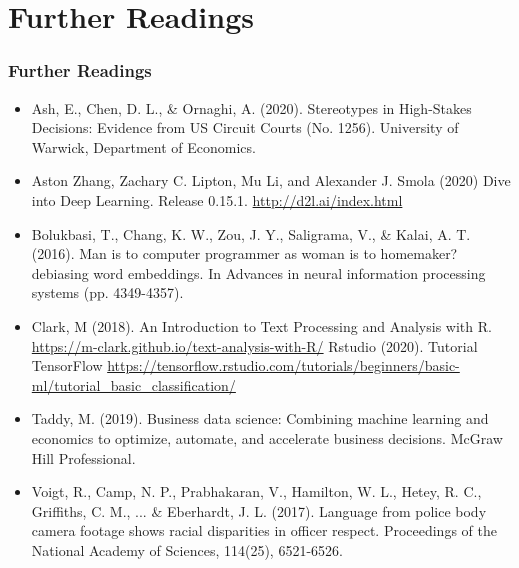 \documentclass[
  shownotes,
  xcolor={svgnames},
  hyperref={colorlinks,citecolor=DarkBlue,linkcolor=DarkRed,urlcolor=DarkBlue}
  , aspectratio=169]{beamer}
\begin{document}
\section{Further Readings}
\begin{frame}
\frametitle{Further Readings}

\begin{itemize}
\footnotesize

  \item Ash, E., Chen, D. L., \& Ornaghi, A. (2020). Stereotypes in High-Stakes Decisions: Evidence from US Circuit Courts (No. 1256). University of Warwick, Department of Economics.
  \medskip
  \item Aston Zhang, Zachary C. Lipton, Mu Li, and Alexander J. Smola (2020) Dive into Deep Learning. Release 0.15.1. \url{http://d2l.ai/index.html}
  \medskip
  \item Bolukbasi, T., Chang, K. W., Zou, J. Y., Saligrama, V., \& Kalai, A. T. (2016). Man is to computer programmer as woman is to homemaker? debiasing word embeddings. In Advances in neural information processing systems (pp. 4349-4357).
  \medskip
  \item Clark, M (2018). An Introduction to Text Processing and Analysis with R. \url{https://m-clark.github.io/text-analysis-with-R/}
  \medskip
  Rstudio (2020). Tutorial TensorFlow \url{https://tensorflow.rstudio.com/tutorials/beginners/basic-ml/tutorial_basic_classification/}
  \medskip
  \item Taddy, M. (2019). Business data science: Combining machine learning and economics to optimize, automate, and accelerate business decisions. McGraw Hill Professional.
  \medskip
  \item Voigt, R., Camp, N. P., Prabhakaran, V., Hamilton, W. L., Hetey, R. C., Griffiths, C. M., ... \& Eberhardt, J. L. (2017). Language from police body camera footage shows racial disparities in officer respect. Proceedings of the National Academy of Sciences, 114(25), 6521-6526.

  
\end{itemize}

\end{frame}
\end{document}
